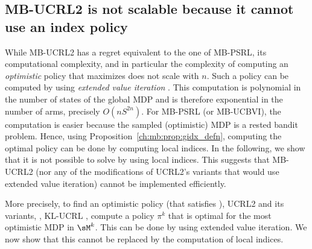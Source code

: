 \subsection{MB-UCRL2 is not scalable because it cannot use an index policy}
\label{ssec:no-OFU}

While MB-UCRL2 has a regret equivalent to the one of MB-PSRL, its computational complexity, and in particular the complexity of computing an \emph{optimistic} policy that maximizes  does not scale with $n$. Such a policy can be computed by using \emph{extended value iteration} \cite{jaksch2010near}. This computation is polynomial in the number of states of the global MDP and is therefore exponential in the number of arms, precisely $O(nS^{2n})$.
For MB-PSRL (or MB-UCBVI), the computation is easier because the sampled (optimistic) MDP is a rested bandit problem. Hence, using Proposition~\ref{ch:mb:prop:gidx_defn}, computing the optimal policy can be done by computing local indices. In the following, we show that it is not possible to solve  by using local indices. This suggests that MB-UCRL2 (nor any of the modifications of UCRL2's variants that would use extended value iteration) cannot be implemented efficiently.

More precisely, to find an optimistic policy (that satisfies ), UCRL2 and its variants, \eg, KL-UCRL \cite{filippi2010optimism}, compute a policy $\pi^k$ that is optimal for the most optimistic MDP in $\sM^k$. This can be done by using extended value iteration. We now show that this cannot be replaced by the computation of local indices.

